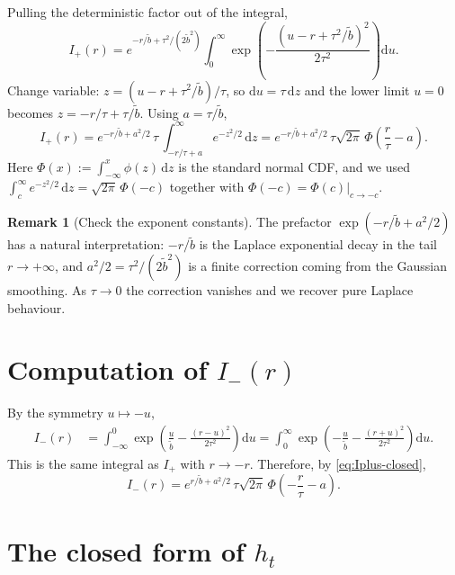 \documentclass[11pt,a4paper,openany]{book}
\theoremstyle{plainserif}
\theoremstyle{definition}
\theoremstyle{remarkstyle}
\newtheorem*{remark}{Remark}
\newcommand{\btilde}{\tilde{b}}
\begin{document}
Pulling the deterministic factor out of the integral,
\begin{equation}
I_+(r) = e^{-r/\btilde + \tau^2/(2\btilde^2)}
   \int_0^\infty \exp\!\left(-\frac{(u - r + \tau^2/\btilde)^2}{2\tau^2}\right)\mathrm{d}u.
\label{eq:Iplus-after-square}
\end{equation}
Change variable: $z = (u - r + \tau^2/\btilde)/\tau$, so $\mathrm{d}u = \tau\,\mathrm{d}z$
and the lower limit $u = 0$ becomes $z = -r/\tau + \tau/\btilde$.
Using $a = \tau/\btilde$,
\begin{equation}
I_+(r) = e^{-r/\btilde + a^2/2}\, \tau\, \int_{-r/\tau + a}^\infty
         e^{-z^2/2}\,\mathrm{d}z
       = e^{-r/\btilde + a^2/2}\, \tau\sqrt{2\pi}\,\Phi\!\left(\frac{r}{\tau} - a\right).
\label{eq:Iplus-closed}
\end{equation}
Here $\Phi(x) := \int_{-\infty}^x \phi(z)\,\mathrm{d}z$ is the standard normal
CDF, and we used $\int_c^\infty e^{-z^2/2}\,\mathrm{d}z = \sqrt{2\pi}\,\Phi(-c)$
together with $\Phi(-c) = \Phi(c)\bigl|_{c\to -c}$.

\begin{remark}[Check the exponent constants]
The prefactor $\exp(-r/\btilde + a^2/2)$ has a natural interpretation:
$-r/\btilde$ is the Laplace exponential decay in the tail $r\to+\infty$,
and $a^2/2 = \tau^2/(2\btilde^2)$ is a finite correction coming from the
Gaussian smoothing. As $\tau\to 0$ the correction vanishes and we recover
pure Laplace behaviour.
\end{remark}

\section{Computation of $I_-(r)$}

By the symmetry $u \mapsto -u$,
\begin{align}
I_-(r) &= \int_{-\infty}^0 \exp\!\left(\frac{u}{\btilde} - \frac{(r-u)^2}{2\tau^2}\right)\mathrm{d}u
        = \int_0^\infty \exp\!\left(-\frac{u}{\btilde} - \frac{(r+u)^2}{2\tau^2}\right)\mathrm{d}u.
\end{align}
This is the same integral as $I_+$ with $r \to -r$. Therefore, by
\eqref{eq:Iplus-closed},
\begin{equation}
I_-(r) = e^{r/\btilde + a^2/2}\,\tau\sqrt{2\pi}\,\Phi\!\left(-\frac{r}{\tau} - a\right).
\label{eq:Iminus-closed}
\end{equation}

\section{The closed form of $h_t$}
\end{document}
